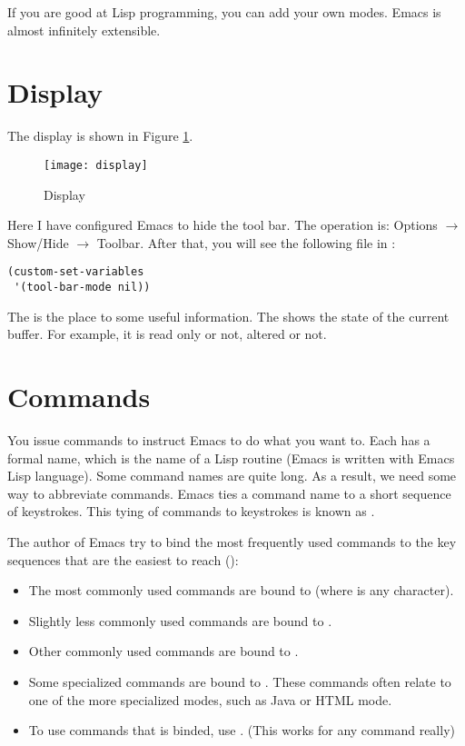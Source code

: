 If you are good at Lisp programming, you can add your own modes.
Emacs is almost infinitely extensible.


\section{Display}
\label{sec:display}

The display is shown in Figure \ref{fig:display}.

\begin{figure}[!htbp]
  \centering
  \texttt{[image: display]}
  \caption{Display}
  \label{fig:display}
\end{figure}


Here I have configured Emacs to hide the tool bar.
The operation is: Options $\longrightarrow$ Show/Hide $\longrightarrow$ Toolbar.
After that, you will see the following file in :

\begin{lstlisting}
(custom-set-variables
 '(tool-bar-mode nil))
\end{lstlisting}

The  is the place to some useful information.
The  shows the state of the current buffer.
For example, it is read only or not, altered or not.

\section{Commands}
You issue commands to instruct Emacs to do what you want to.
Each  has a formal name, which is the name of a Lisp routine (Emacs is written with Emacs Lisp language).
Some command names are quite long.
As a result, we need some way to abbreviate commands.
Emacs ties a command name to a short sequence of keystrokes.
This tying of commands to keystrokes is known as .


The author of Emacs try to bind the most frequently used commands to the key sequences that are the easiest to reach ():
\begin{itemize}
\item The most commonly used commands are bound to (where  is any character).
\item Slightly less commonly used commands are bound to .
\item Other commonly used commands are bound to .
\item Some specialized commands are bound to . These commands often relate to one of the more specialized modes, such as Java or HTML mode.
\item To use commands that is binded, use . (This works for any command really)
\end{itemize}


